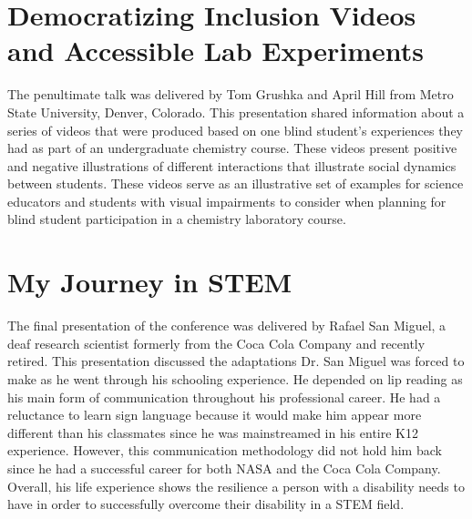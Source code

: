 \documentclass[11.5pt]{sig-alternate} %
\begin{document}
\begin{large}
\section*{Democratizing Inclusion Videos and Accessible Lab Experiments}
The penultimate talk was delivered by Tom Grushka and April Hill from Metro State University, Denver, Colorado. This presentation shared information about a series of videos that were produced based on one blind student’s experiences they had as part of an undergraduate chemistry course. These videos present positive and negative illustrations of different interactions that illustrate social dynamics between students. These videos serve as an illustrative set of examples for science educators and students with visual impairments to consider when planning for blind student participation in a chemistry laboratory course.

\section*{My Journey in STEM}
The final presentation of the conference was delivered by Rafael San Miguel, a deaf research scientist formerly from the Coca Cola Company and recently retired. This presentation discussed the adaptations Dr. San Miguel was forced to make as he went through his schooling experience. He depended on lip reading as his main form of communication throughout his professional career. He had a reluctance to learn sign language because it would make him appear more different than his classmates since he was mainstreamed in his entire K12 experience. However, this communication methodology did not hold him back since he had a successful career for both NASA and the Coca Cola Company. Overall, his life experience shows the resilience a person with a disability needs to have in order to successfully overcome their disability in a STEM field.


\end{large}
\end{document}
